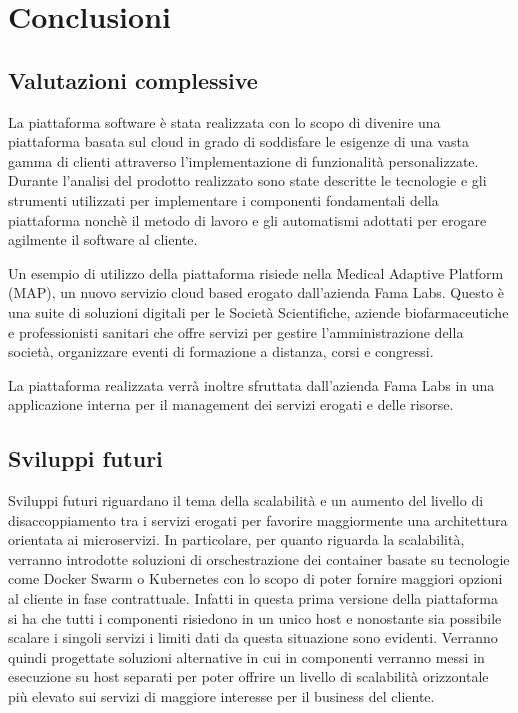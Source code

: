 \chapter{Conclusioni}
\section{Valutazioni complessive}
La piattaforma software è stata realizzata con lo scopo di divenire una piattaforma basata sul cloud
in grado di soddisfare le esigenze di una vasta gamma di clienti attraverso l'implementazione
di funzionalità personalizzate. Durante l'analisi del prodotto realizzato sono state descritte le tecnologie
e gli strumenti utilizzati per implementare i componenti fondamentali della piattaforma nonchè
il metodo di lavoro e gli automatismi adottati per erogare agilmente il software al cliente.

Un esempio di utilizzo della piattaforma risiede nella Medical Adaptive Platform (MAP), un nuovo servizio
cloud based erogato dall'azienda Fama Labs. Questo è una suite di soluzioni digitali per le Società Scientifiche,
aziende biofarmaceutiche e professionisti sanitari che offre servizi per gestire l'amministrazione della società,
organizzare eventi di formazione a distanza, corsi e congressi.

La piattaforma realizzata verrà inoltre sfruttata dall'azienda Fama Labs in una applicazione interna
per il management dei servizi erogati e delle risorse.


\section{Sviluppi futuri}
Sviluppi futuri riguardano il tema della scalabilità e un aumento del livello di disaccoppiamento tra i servizi erogati
per favorire maggiormente una architettura orientata ai microservizi.
In particolare, per quanto riguarda la scalabilità, verranno introdotte soluzioni di orschestrazione
dei container basate su tecnologie come Docker Swarm o Kubernetes con lo scopo di poter fornire maggiori opzioni al
cliente in fase contrattuale. Infatti in questa prima versione della piattaforma si ha che tutti i componenti risiedono in un unico host
e nonostante sia possibile scalare i singoli servizi i limiti dati da questa situazione sono evidenti.
Verranno quindi progettate soluzioni alternative in cui in componenti verranno messi in esecuzione su host separati per
poter offrire un livello di scalabilità orizzontale più elevato sui servizi di maggiore interesse per il business del cliente.

